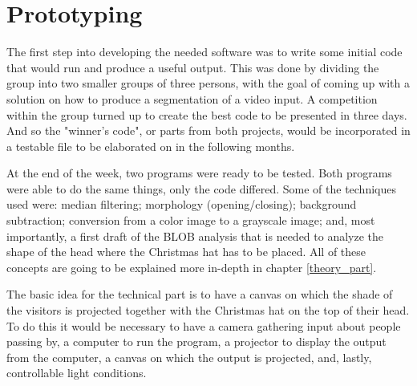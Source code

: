
\section{Prototyping}
The first step into developing the needed software was to write some initial code that would run and produce a useful output. This was done by dividing the group into two smaller groups of three persons, with the goal of coming up with a solution on how to produce a segmentation of a video input. A competition within the group turned up to create the best code to be presented in three days. And so the "winner's code", or parts from both projects, would be incorporated in a testable file to be elaborated on in the following months.

At the end of the week, two programs were ready to be tested. Both programs were able to do the same things, only the code differed. Some of the techniques used were: median filtering; morphology (opening/closing); background subtraction; conversion from a color image to a grayscale image; and, most importantly, a first draft of the BLOB analysis that is needed to analyze the shape of the head where the Christmas hat has to be placed. All of these concepts are going to be explained more in-depth in chapter \ref{theory_part}.

The basic idea for the technical part is to have a canvas on which the shade of the visitors is projected together with the Christmas hat on the top of their head. To do this it would be necessary to have a camera gathering input about people passing by, a computer to run the program, a projector to display the output from the computer, a canvas on which the output is projected, and, lastly, controllable light conditions.


